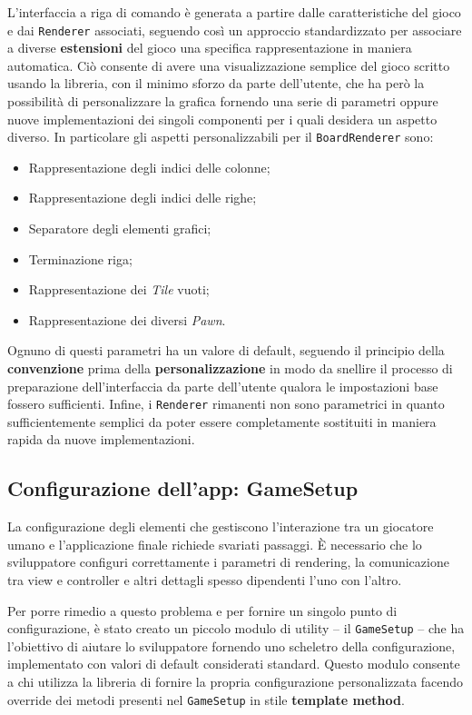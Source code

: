 L'interfaccia a riga di comando è generata a partire dalle caratteristiche del gioco e dai \texttt{Renderer} associati, seguendo così un approccio standardizzato per associare a diverse \textbf{estensioni} del gioco una specifica rappresentazione in maniera automatica.
%
Ciò consente di avere una visualizzazione semplice del gioco scritto usando la libreria, con il minimo sforzo da parte dell'utente, che ha però la possibilità di personalizzare la grafica fornendo una serie di parametri oppure nuove implementazioni dei singoli componenti per i quali desidera un aspetto diverso.
%
In particolare gli aspetti personalizzabili per il \texttt{BoardRenderer} sono:
\begin{itemize}
  \item Rappresentazione degli indici delle colonne;
  \item Rappresentazione degli indici delle righe;
  \item Separatore degli elementi grafici;
  \item Terminazione riga;
  \item Rappresentazione dei \textit{Tile} vuoti;
  \item Rappresentazione dei diversi \textit{Pawn}.
\end{itemize}
%
Ognuno di questi parametri ha un valore di default, seguendo il principio della \textbf{convenzione} prima della \textbf{personalizzazione} in modo da snellire il processo di preparazione dell'interfaccia da parte dell'utente qualora le impostazioni base fossero sufficienti.
%
Infine, i \texttt{Renderer} rimanenti non sono parametrici in quanto sufficientemente semplici da poter essere completamente sostituiti in maniera rapida da nuove implementazioni.


\subsection{Configurazione dell'app: GameSetup}

La configurazione degli elementi che gestiscono l'interazione tra un giocatore umano e l'applicazione finale richiede svariati passaggi.
%
È necessario che lo sviluppatore configuri correttamente i parametri di rendering, la comunicazione tra view e controller e altri dettagli spesso dipendenti l'uno con l'altro.

Per porre rimedio a questo problema e per fornire un singolo punto di configurazione, è stato creato un piccolo modulo di utility -- il \texttt{GameSetup} -- che ha l'obiettivo di aiutare lo sviluppatore fornendo uno scheletro della configurazione, implementato con valori di default considerati standard.
%
Questo modulo consente a chi utilizza la libreria di fornire la propria configurazione personalizzata facendo override dei metodi presenti nel \texttt{GameSetup} in stile \textbf{template method}.

